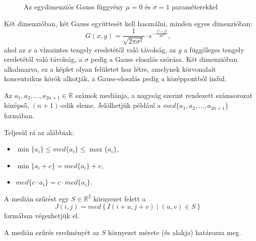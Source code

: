 \begin{figure}[h!]
{}
\caption{Az egydimenziós Gauss függvény $\mu = 0$ és $\sigma = 1$ paraméterekkel}
\label{fig:gauss}
\end{figure}

Két dimenzióban, két Gauss együttesét kell használni, minden egyes dimenzióban: 
$$
G(x,y) =
\frac{1}{\sqrt{2\pi\sigma^{2}}} \cdot
e^{-\frac{x^{2}+y^{2}}{2\sigma^{2}}},
$$
ahol az $x$ a vízszintes tengely eredetétől való távolság, az $y$ a függőleges tengely eredetétől való távolság, a $\sigma$ pedig a Gauss eloszlás szórása. Két dimenzióban alkalmazva, ez a képlet olyan felületet hoz létre, amelynek körvonalait koncentrikus körök alkotják, a Gauss-eloszlás pedig a középpontból indul.


Az $a_1, a_2, \dots, a_{2n+1} \in \mathbb{R}$ számok mediánja, a nagyság szerint rendezett számsorozat középső, $(n+1)$-edik eleme. Jelölhetjük például a
$med\{a_1,a_2,\dots,a_{2n+1}\}$ formában.

Teljesül rá az alábbiak:
\begin{itemize}
\item $\min\{a_i\} \leq med\{a_i\} \leq \max\{a_i\}$,
\item $\min\{a_i+c\} = med\{a_i\}+c$,
\item $med\{c\cdot a_i\}=c \cdot med\{a_i\}$.
\end{itemize}

A medián szűrést egy $S \in \mathbb{R}^2$ környezet felett a
$$
J(i,j) = med\left\{I(i+u, j+v) \mid (u, v) \in S \right\}
$$
formában végezhetjük el.

A medián szűrés eredményét az $S$ környezet mérete (és alakja) határozza meg.


